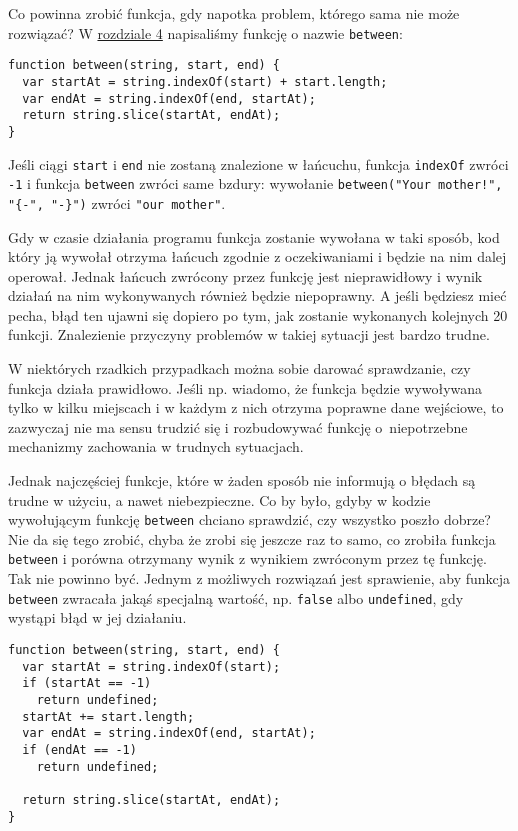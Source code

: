   
Co powinna zrobić funkcja, gdy napotka problem, którego sama nie może rozwiązać? W \hyperref[chap:4]{rozdziale 4} napisaliśmy funkcję o nazwie \texttt{between}:

  
\begin{verbatim} 
function between(string, start, end) {
  var startAt = string.indexOf(start) + start.length;
  var endAt = string.indexOf(end, startAt);
  return string.slice(startAt, endAt);
}
 \end{verbatim}
  
Jeśli ciągi \texttt{start} i \texttt{end} nie zostaną znalezione w łańcuchu, funkcja \texttt{indexOf} zwróci \texttt{-1} i funkcja \texttt{between} zwróci same bzdury: wywołanie \texttt{between("Your mother!", "\{-", "-\}")} zwróci \texttt{"our mother"}.

  
Gdy w czasie działania programu funkcja zostanie wywołana w taki sposób, kod który ją wywołał otrzyma łańcuch zgodnie z oczekiwaniami i będzie na nim dalej operował. Jednak łańcuch zwrócony przez funkcję jest nieprawidłowy i wynik działań na nim wykonywanych również będzie niepoprawny. A jeśli będziesz mieć pecha, błąd ten ujawni się dopiero po tym, jak zostanie wykonanych kolejnych 20 funkcji. Znalezienie przyczyny problemów w takiej sytuacji jest bardzo trudne.

  
W niektórych rzadkich przypadkach można sobie darować sprawdzanie, czy funkcja działa prawidłowo. Jeśli np. wiadomo, że funkcja będzie wywoływana tylko w kilku miejscach i w każdym z nich otrzyma poprawne dane wejściowe, to zazwyczaj nie ma sensu trudzić się i rozbudowywać funkcję o~niepotrzebne mechanizmy zachowania w trudnych sytuacjach.

  
Jednak najczęściej funkcje, które w żaden sposób nie informują o błędach są trudne w użyciu, a nawet niebezpieczne. Co by było, gdyby w kodzie wywołującym funkcję \texttt{between} chciano sprawdzić, czy wszystko poszło dobrze? Nie da się tego zrobić, chyba że zrobi się jeszcze raz to samo, co zrobiła funkcja \texttt{between} i porówna otrzymany wynik z wynikiem zwróconym przez tę funkcję. Tak nie powinno być. Jednym z możliwych rozwiązań jest sprawienie, aby funkcja \texttt{between} zwracała jakąś specjalną wartość, np. \texttt{false} albo \texttt{undefined}, gdy wystąpi błąd w jej działaniu.

  
\begin{verbatim} 
function between(string, start, end) {
  var startAt = string.indexOf(start);
  if (startAt == -1)
    return undefined;
  startAt += start.length;
  var endAt = string.indexOf(end, startAt);
  if (endAt == -1)
    return undefined;

  return string.slice(startAt, endAt);
}
 \end{verbatim}
  
